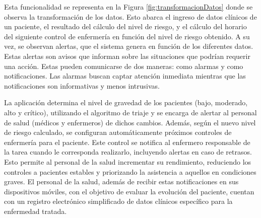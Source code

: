 Esta funcionalidad se representa en la Figura \ref{fig:transformacionDatos} donde se observa la transformación de los datos. Esto abarca el ingreso de datos clínicos de un paciente, el resultado del cálculo del nivel de riesgo, y el cálculo del horario del siguiente control de enfermería en función del nivel de riesgo obtenido. A su vez, se observan alertas, que el sistema genera en función de los diferentes datos. Estas alertas son avisos que informan sobre las situaciones que podrían requerir una acción. Estas pueden comunicarse de dos maneras: como alarmas y como notificaciones. Las alarmas buscan captar atención inmediata mientras que las notificaciones son informativas y menos intrusivas.

La aplicación determina el nivel de gravedad de los pacientes (bajo, moderado, alto y crítico), utilizando el algoritmo de triaje y se encarga de alertar al personal de salud (médicos y enfermeros) de dichos cambios. Además, según el nuevo nivel de riesgo calculado, se configuran automáticamente próximos controles de enfermería para el paciente. Este control se notifica al enfermero responsable de la tarea cuando le corresponda realizarlo, incluyendo alertas en caso de retrasos. Esto permite al personal de la salud incrementar su rendimiento, reduciendo los controles a pacientes estables y priorizando la asistencia a aquellos en condiciones graves. El personal de la salud, además de recibir estas notificaciones en sus dispositivos móviles, con el objetivo de evaluar la evolución del paciente, cuentan con un registro electrónico simplificado de datos clínicos específico para la enfermedad tratada.


